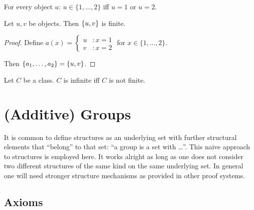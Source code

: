 \documentclass[english,11pt]{article}
\newcommand{\Seq}[2]{\{#1,\dots,#2\}}
\newcommand{\FinSet}[3]{\{#1_{#2},\dots,#1_{#3}\}}
\begin{document}
\begin{forthel}
\begin{lemma}
For every object $u$:
$u \in \Seq{1}{2}$ iff $u = 1$ or $u = 2$.
\end{lemma}

\begin{lemma}
Let $u,v$ be objects. Then
$\{u,v\}$ is finite.
\end{lemma}

\begin{proof}
Define
$  a(x) =
    \begin{cases}
    u  & : x = 1 \\
    v  & : x = 2
    \end{cases} $
  for $x \in \Seq{1}{2}$.

Then $\FinSet{a}{1}{2} = \unp{u}{v}$. 
\end{proof}

\begin{definition} Let $C$ be a class.
$C$ is infinite iff $C$ is not finite.
\end{definition}

\end{forthel}

\section{(Additive) Groups}

It is common to define structures as an underlying set with further
structural elements that ``belong'' to that set: ``a group is a set with
\dots''. This naive approach to structures is employed here.
It works alright as long as one
does not consider two different structures of the same kind on the
same underlying set. In general one will need stronger structure mechanisms as 
provided in other proof systems.
  
\subsection{Axioms}
\end{document}
